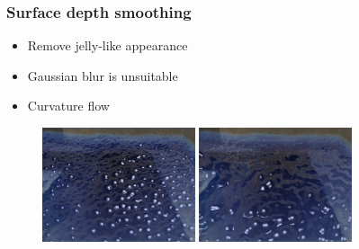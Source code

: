 \documentclass{beamer}
\begin{document}
	\begin{frame}[t]\frametitle{Surface depth smoothing}
	    \begin{itemize}
	    	\item Remove jelly-like appearance
	    	\item Gaussian blur is unsuitable
	    	\item Curvature flow
	    \end{itemize}
	    \begin{figure}
	    	\centering
	    	\includegraphics[width=0.4\textwidth]{gaussian_water.png} \hspace{1em}
	    	\includegraphics[width=0.4\textwidth]{curvature_water.png}
	    \end{figure}
	\end{frame}
\end{document}
